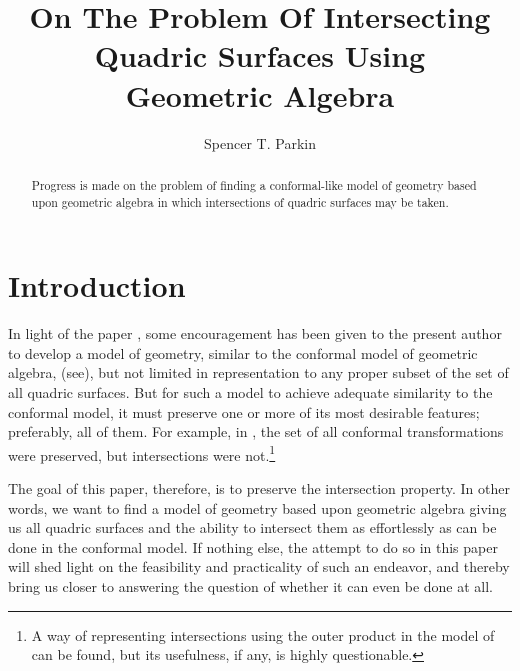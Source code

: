 \documentclass{birkjour}
\theoremstyle{definition}
\theoremstyle{remark}
\numberwithin{equation}{section}
\begin{document}
\title{On The Problem Of Intersecting\\Quadric Surfaces Using\\Geometric Algebra}

\author{Spencer T. Parkin}
\address{102 W. 500 S., \\
Salt Lake City, UT  84101} 



\begin{abstract}
Progress is made on the problem of finding a conformal-like model of geometry
based upon geometric algebra in which intersections of quadric surfaces
may be taken.
\end{abstract}


\maketitle

\section{Introduction}

In light of the paper \cite{Parkin13}, some encouragement has been given to the present
author to develop a model of geometry, similar to the conformal model of geometric
algebra, (see\cite{Hestenes01,Dorst07,Lasenby04}), but not limited in representation to any proper subset of the set of all
quadric surfaces.  But for such a model to achieve adequate similarity to the conformal model,
it must preserve one or more of its most desirable features; preferably, all of them.
For example, in \cite{Parkin13}, the set of all conformal transformations were preserved, but
intersections were not.\footnote{A way of representing intersections using the outer
product in the model of \cite{Parkin13} can be found, but its usefulness, if any, is highly questionable.}

The goal of this paper, therefore, is to
preserve the intersection property.  In other words, we want to find a model of geometry based upon
geometric algebra giving us all quadric surfaces and the ability to intersect them
as effortlessly as can be done in the conformal model.  If nothing else, the attempt
to do so in this paper will shed light on the feasibility and practicality of such an endeavor, and thereby
bring us closer to answering the question of whether it can even be done at all.
\end{document}
